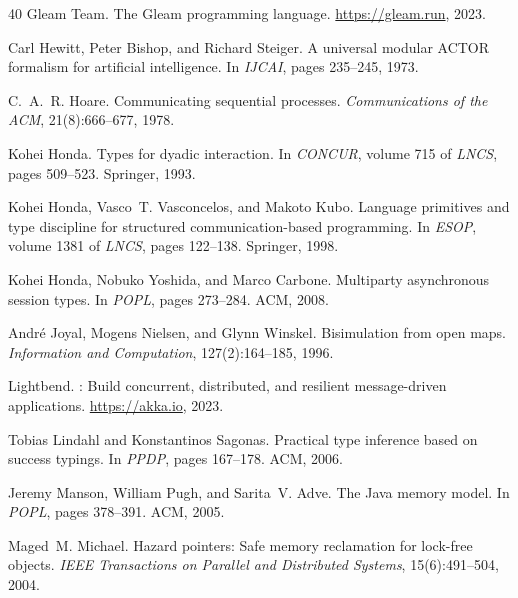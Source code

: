 \documentclass[11pt,a4paper]{article}
\begin{document}
\begin{thebibliography}{40}
{Gleam Team}.
\newblock The {Gleam} programming language.
\newblock \url{https://gleam.run}, 2023.

Carl Hewitt, Peter Bishop, and Richard Steiger.
\newblock A universal modular {ACTOR} formalism for artificial intelligence.
\newblock In \emph{IJCAI}, pages 235--245, 1973.

C.~A.~R. Hoare.
\newblock Communicating sequential processes.
\newblock \emph{Communications of the ACM}, 21(8):666--677, 1978.

Kohei Honda.
\newblock Types for dyadic interaction.
\newblock In \emph{CONCUR}, volume 715 of \emph{LNCS}, pages 509--523. Springer, 1993.

Kohei Honda, Vasco~T. Vasconcelos, and Makoto Kubo.
\newblock Language primitives and type discipline for structured communication-based programming.
\newblock In \emph{ESOP}, volume 1381 of \emph{LNCS}, pages 122--138. Springer, 1998.

Kohei Honda, Nobuko Yoshida, and Marco Carbone.
\newblock Multiparty asynchronous session types.
\newblock In \emph{POPL}, pages 273--284. ACM, 2008.

Andr{\'e} Joyal, Mogens Nielsen, and Glynn Winskel.
\newblock Bisimulation from open maps.
\newblock \emph{Information and Computation}, 127(2):164--185, 1996.

{Lightbend}.
: Build concurrent, distributed, and resilient message-driven applications.
\newblock \url{https://akka.io}, 2023.

Tobias Lindahl and Konstantinos Sagonas.
\newblock Practical type inference based on success typings.
\newblock In \emph{PPDP}, pages 167--178. ACM, 2006.

Jeremy Manson, William Pugh, and Sarita~V. Adve.
\newblock The {Java} memory model.
\newblock In \emph{POPL}, pages 378--391. ACM, 2005.

Maged~M. Michael.
\newblock Hazard pointers: Safe memory reclamation for lock-free objects.
\newblock \emph{IEEE Transactions on Parallel and Distributed Systems}, 15(6):491--504, 2004.


\end{thebibliography}
\end{document}
